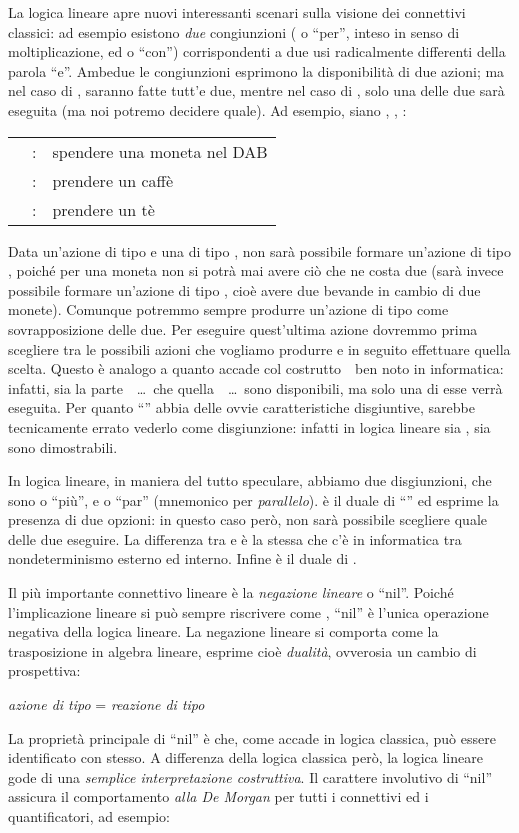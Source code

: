 \documentclass[12pt,a4paper,openright,twoside]{report}
\begin{document}
La logica lineare apre nuovi interessanti scenari sulla visione dei connettivi classici: ad esempio esistono \emph{due} congiunzioni ( o ``per'', inteso in senso di moltiplicazione, ed  o ``con'') corrispondenti a due usi radicalmente differenti della parola ``e''. Ambedue le congiunzioni esprimono la disponibilit\`a di due azioni; ma nel caso di , saranno fatte tutt'e due, mentre nel caso di , solo una delle due sar\`a eseguita (ma noi potremo decidere quale). Ad esempio, siano , , :
\begin{center}
\begin{tabular}{lll}
	 & : & spendere una moneta nel DAB \\
	 & : & prendere un caff\`e \\
	 & : & prendere un t\`e 
\end{tabular}
\end{center}
Data un'azione di tipo  e una di tipo , non sar\`a possibile formare un'azione di tipo , poich\'e per una moneta non si potr\`a mai avere ci\`o che ne costa due (sar\`a invece possibile formare un'azione di tipo , cio\`e avere due bevande in cambio di due monete). Comunque potremmo sempre produrre un'azione di tipo  come sovrapposizione delle due. Per eseguire quest'ultima azione dovremmo prima scegliere tra le possibili azioni che vogliamo produrre e in seguito effettuare quella scelta. Questo \`e analogo a quanto accade col costrutto~~ben noto in informatica: infatti, sia la parte~~\dots~che quella~~\dots~sono disponibili, ma solo una di esse verr\`a eseguita. Per quanto ``'' abbia delle ovvie caratteristiche disgiuntive, sarebbe tecnicamente errato vederlo come disgiunzione: infatti in logica lineare sia , sia  sono dimostrabili.

In logica lineare, in maniera del tutto speculare, abbiamo due disgiunzioni, che sono  o ``pi\`u'', e  o ``par'' (mnemonico per \emph{parallelo}).  \`e il duale di ``'' ed esprime la presenza di due opzioni: in questo caso per\`o, non sar\`a possibile scegliere quale delle due eseguire. La differenza tra  e  \`e la stessa che c'\`e in informatica tra nondeterminismo esterno ed interno. Infine  \`e il duale di .

Il pi\`u importante connettivo lineare \`e la \emph{negazione lineare}  o ``nil''. Poich\'e l'implicazione lineare si pu\`o sempre riscrivere come , ``nil'' \`e l'unica operazione negativa della logica lineare. La negazione lineare si comporta come la trasposizione in algebra lineare, esprime cio\`e \emph{dualit\`a}, ovverosia un cambio di prospettiva:
\begin{center}
	\emph{azione di tipo}  = \emph{reazione di tipo} 
\end{center}
La propriet\`a principale di ``nil'' \`e che, come accade in logica classica,  pu\`o essere identificato con  stesso. A differenza della logica classica per\`o, la logica lineare gode di una \emph{semplice interpretazione costruttiva}. Il carattere involutivo di ``nil'' assicura il comportamento \emph{alla De Morgan} per tutti i connettivi ed i quantificatori, ad esempio:
\end{document}
